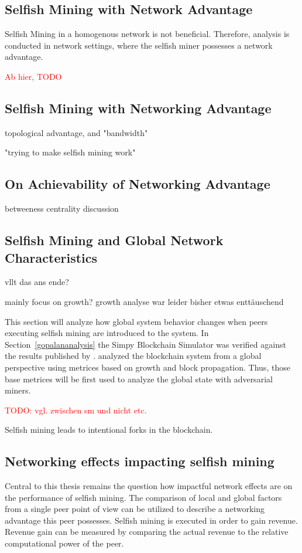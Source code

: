 \subsection{Selfish Mining with Network Advantage}
Selfish Mining in a homogenous network is not beneficial. Therefore, analysis is conducted in network settings, where the selfish miner possesses a network advantage. 






\ifx
\newpage
\textcolor{red}{Ab hier, TODO}
\subsection{Selfish Mining with Networking Advantage}

topological advantage, and "bandwidth"

"trying to make selfish mining work"
\subsection{On Achievability of Networking Advantage}
betweeness centrality discussion
\subsection{Selfish Mining and Global Network Characteristics}
vllt das ans ende?	

mainly focus on growth? growth analyse war leider bisher etwas enttäuschend

This section will analyze how global system behavior changes when peers executing selfish mining are introduced to the system. In Section~\ref{gopalananalysis} the Simpy Blockchain Simulator was verified against the results published by \gopalan. \gopalan analyzed the blockchain system from a global perspective using metrices based on growth and block propagation. Thus, those base metrices will be first used to analyze the global state with adversarial miners.

\textcolor{red}{TODO: vgl. zwischen sm und nicht etc.}

Selfish mining leads to intentional forks in the blockchain.

  






\subsection{Networking effects impacting selfish mining}
Central to this thesis remains the question how impactful network effects are on the performance of selfish mining. The comparison of local and global factors from a single peer point of view can be utilized to describe a networking advantage this peer possesses.
Selfish mining is executed in order to gain revenue. Revenue gain can be measured by comparing the actual revenue to the relative computational power of the peer.
